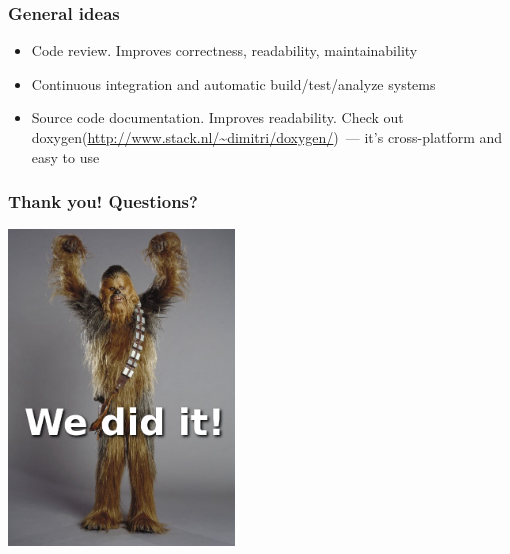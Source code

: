 \documentclass{beamer}
\begin{document}
\begin{frame}
\frametitle{General ideas}
\begin{itemize}
\item Code review. Improves correctness, readability, maintainability 
\item Continuous integration and automatic build/test/analyze systems
\item Source code documentation. Improves readability. Check out doxygen(\url{http://www.stack.nl/~dimitri/doxygen/})~--- it's cross-platform and easy to use 
\end{itemize}
\end{frame}

\begin{frame}
\frametitle{Thank you! Questions?}
\begin{center}
\includegraphics[width=0.45\textwidth]{img/chubaka}
\end{center}
\end{frame}
\end{document}
